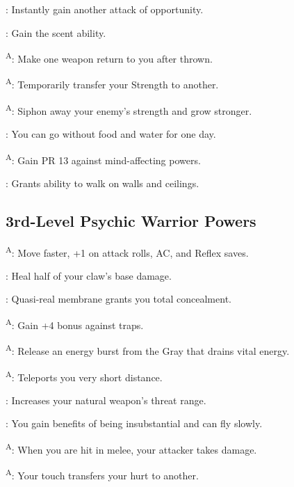 : Instantly gain another attack of opportunity.

: Gain the scent ability.

\textsuperscript{A}: Make one weapon return to you after thrown. %

\textsuperscript{A}: Temporarily transfer your Strength to another. %

\textsuperscript{A}: Siphon away your enemy's strength and grow stronger.

: You can go without food and water for one day.

\textsuperscript{A}: Gain PR 13 against mind-affecting powers.

: Grants ability to walk on walls and ceilings.



\subsection{3rd-Level Psychic Warrior Powers}

\textsuperscript{A}: Move faster, +1 on attack rolls, AC, and Reflex saves. %

: Heal half of your claw's base damage.

: Quasi-real membrane grants you total concealment.

\textsuperscript{A}: Gain +4 bonus against traps.

\textsuperscript{A}: Release an energy burst from the Gray that drains vital energy. %

\textsuperscript{A}: Teleports you very short distance.

: Increases your natural weapon's threat range.

: You gain benefits of being insubstantial and can fly slowly.

\textsuperscript{A}: When you are hit in melee, your attacker takes damage.

\textsuperscript{A}: Your touch transfers your hurt to another.

